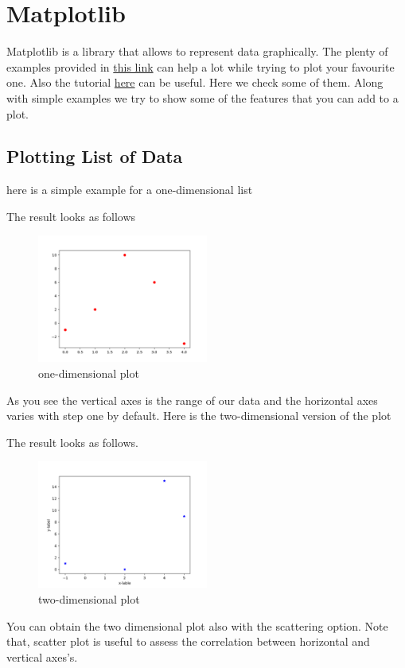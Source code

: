 \documentclass[10pt,a4paper]{article}
\begin{document}


\section{Matplotlib}
Matplotlib is a library that allows to represent data graphically. The plenty of examples provided in \href{https://matplotlib.org/gallery/index.html}{this link} can help a lot while trying to plot your favourite one. Also the tutorial \href{https://python-course.eu/matplotlib.php}{here} can be useful.
Here we check some of them. Along with simple examples we try to show some of the features that you can add to a plot.


\subsection{Plotting List of Data} \label{plot_list}
here is a simple example for a one-dimensional list

The result looks as follows
\begin{figure}[htbp]\centering \caption{one-dimensional plot}
\includegraphics[width=0.5\textwidth]{plot_list_data_1.png}
\end{figure}
As you see the vertical axes is the range of our data and the horizontal axes varies with step one by default. 
Here is the two-dimensional version of the plot

The result looks as follows. 
\begin{figure}[htbp]\centering \caption{two-dimensional plot}
\includegraphics[width=0.5\textwidth]{plot_list_data_2.png}
\end{figure}
You can obtain the two dimensional plot also with the scattering option. Note that, scatter plot is useful to assess the correlation between horizontal and vertical axes's.

\end{document}
